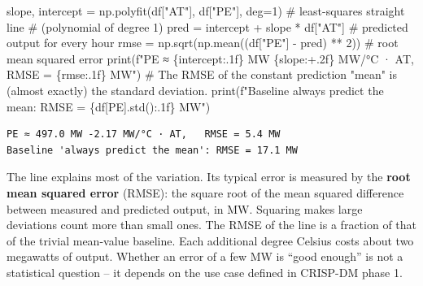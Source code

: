 \documentclass[
  letterpaper,
  DIV=11,
  numbers=noendperiod]{scrreprt}
\newenvironment{Shaded}{\begin{snugshade}}{\end{snugshade}}
\newcommand{\BuiltInTok}[1]{\textcolor[rgb]{0.00,0.23,0.31}{#1}}
\newcommand{\CommentTok}[1]{\textcolor[rgb]{0.37,0.37,0.37}{#1}}
\newcommand{\DecValTok}[1]{\textcolor[rgb]{0.68,0.00,0.00}{#1}}
\newcommand{\NormalTok}[1]{\textcolor[rgb]{0.00,0.23,0.31}{#1}}
\newcommand{\OperatorTok}[1]{\textcolor[rgb]{0.37,0.37,0.37}{#1}}
\newcommand{\SpecialCharTok}[1]{\textcolor[rgb]{0.37,0.37,0.37}{#1}}
\newcommand{\SpecialStringTok}[1]{\textcolor[rgb]{0.13,0.47,0.30}{#1}}
\newcommand{\StringTok}[1]{\textcolor[rgb]{0.13,0.47,0.30}{#1}}
\begin{document}
\begin{Shaded}
\begin{Highlighting}[]
\NormalTok{slope, intercept }\OperatorTok{=}\NormalTok{ np.polyfit(df[}\StringTok{"AT"}\NormalTok{], df[}\StringTok{"PE"}\NormalTok{], deg}\OperatorTok{=}\DecValTok{1}\NormalTok{)   }\CommentTok{\# least{-}squares straight line}
                                                             \CommentTok{\# (polynomial of degree 1)}
\NormalTok{pred }\OperatorTok{=}\NormalTok{ intercept }\OperatorTok{+}\NormalTok{ slope }\OperatorTok{*}\NormalTok{ df[}\StringTok{"AT"}\NormalTok{]                          }\CommentTok{\# predicted output for every hour}
\NormalTok{rmse }\OperatorTok{=}\NormalTok{ np.sqrt(np.mean((df[}\StringTok{"PE"}\NormalTok{] }\OperatorTok{{-}}\NormalTok{ pred) }\OperatorTok{**} \DecValTok{2}\NormalTok{))              }\CommentTok{\# root mean squared error}
\BuiltInTok{print}\NormalTok{(}\SpecialStringTok{f"PE ≈ }\SpecialCharTok{\{}\NormalTok{intercept}\SpecialCharTok{:.1f\}}\SpecialStringTok{ MW }\SpecialCharTok{\{}\NormalTok{slope}\SpecialCharTok{:+.2f\}}\SpecialStringTok{ MW/°C · AT,   RMSE = }\SpecialCharTok{\{}\NormalTok{rmse}\SpecialCharTok{:.1f\}}\SpecialStringTok{ MW"}\NormalTok{)}
\CommentTok{\# The RMSE of the constant prediction "mean" is (almost exactly) the standard deviation.}
\BuiltInTok{print}\NormalTok{(}\SpecialStringTok{f"Baseline \textquotesingle{}always predict the mean\textquotesingle{}: RMSE = }\SpecialCharTok{\{}\NormalTok{df[}\StringTok{\textquotesingle{}PE\textquotesingle{}}\NormalTok{]}\SpecialCharTok{.}\NormalTok{std()}\SpecialCharTok{:.1f\}}\SpecialStringTok{ MW"}\NormalTok{)}
\end{Highlighting}
\end{Shaded}

\begin{verbatim}
PE ≈ 497.0 MW -2.17 MW/°C · AT,   RMSE = 5.4 MW
Baseline 'always predict the mean': RMSE = 17.1 MW
\end{verbatim}

The line explains most of the variation. Its typical error is measured
by the \textbf{root mean squared error} (RMSE): the square root of the
mean squared difference between measured and predicted output, in MW.
Squaring makes large deviations count more than small ones. The RMSE of
the line is a fraction of that of the trivial mean-value baseline. Each
additional degree Celsius costs about two megawatts of output. Whether
an error of a few MW is ``good enough'' is not a statistical question --
it depends on the use case defined in CRISP-DM phase 1.
\end{document}
